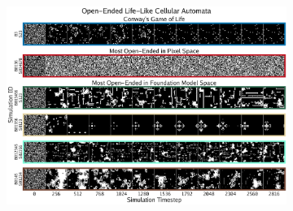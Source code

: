 \documentclass{article}
\begin{document}
\begin{figure}[htbp]
    \centering
    \begin{subfigure}{\textwidth}
        \centering
        \includegraphics[width=1.0\textwidth]{figs/oe_gol_1_compressed.pdf}
        \caption{}
        \label{fig:oe_gol_1}
    \end{subfigure}
    

\end{figure}
\end{document}

